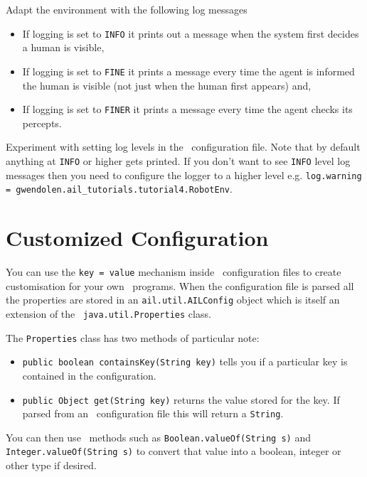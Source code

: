 Adapt the environment with the following log messages
\begin{itemize}
\item If logging is set to \texttt{INFO} it prints out a message when the system first decides a human is visible, 
\item If logging is set to \texttt{FINE} it prints a message every time the agent is informed the human is visible (not just when the human first appears) and,
\item If logging is set to \texttt{FINER} it prints a message every time the agent checks its percepts.
\end{itemize}

Experiment with setting log levels in the \ail\ configuration file.  Note that by default anything at \texttt{INFO} or higher gets printed.  If you don't want to see \texttt{INFO} level log messages then you need to configure the logger to a higher level e.g. \texttt{log.warning = gwendolen.ail\_tutorials.tutorial4.RobotEnv}.

\section{Customized Configuration}

You can use the \texttt{key = value} mechanism inside \ail\ configuration files to create customisation for your own \ail\ programs.  When the configuration file is parsed all the properties are stored in an \texttt{ail.util.AILConfig} object which is itself an extension of the \java\ \texttt{java.util.Properties} class.  

The \texttt{Properties} class has two methods of particular note:
\begin{itemize}
\item \texttt{public boolean containsKey(String key)} tells you if a particular key is contained in the configuration.  
\item \texttt{public Object get(String key)} returns the value stored for the key.  If parsed from an \ail\ configuration file this will return a \texttt{String}.
\end{itemize}
You can then use \java\ methods such as \texttt{Boolean.valueOf(String s)} and \texttt{Integer.valueOf(String s)} to convert that value into a boolean, integer or other type if desired.

